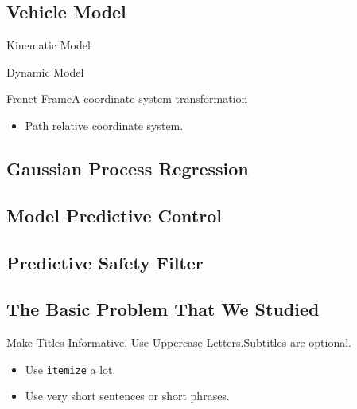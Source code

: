 \documentclass{beamer}
\begin{document}
\subsection{Vehicle Model}

\begin{frame}{Kinematic Model}
\end{frame}

\begin{frame}{Dynamic Model}
\end{frame}

\begin{frame}{Frenet Frame}{A coordinate system transformation}
    \begin{itemize}
        \item Path relative coordinate system.
    \end{itemize}
\end{frame}

\subsection{Gaussian Process Regression}

\subsection{Model Predictive Control}

\subsection{Predictive Safety Filter}

\subsection{The Basic Problem That We Studied}

\begin{frame}{Make Titles Informative. Use Uppercase Letters.}{Subtitles are optional.}
  \begin{itemize}
  \item
    Use \texttt{itemize} a lot.
  \item
    Use very short sentences or short phrases.
  \end{itemize}
\end{frame}
\end{document}
